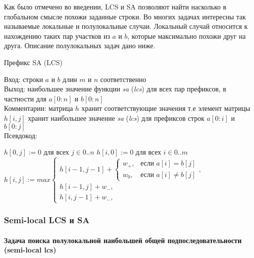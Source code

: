 Как было отмечено во введении, LCS  и SA позволяют найти насколько в глобальном смысле похожи заданные строки.
Во многих задачах интересны так называемые локальные и полулокальные случаи.
Локальный случай относится к нахождению таких пар участков из $a$ и $b$, которые максимально похожи друг на друга.
Описание полулокальных задач дано ниже.
\begin{algorithm}
\caption{Префикс SA (LCS)}\label{alg:lcssa}
Вход: строки $a$ и $b$ длин $m$ и $n$ соответственно\\
Выход: наибольшее значение функции \emph{sa} (\emph{lcs}) для всех пар префиксов, в частности для $a[0:n]$ и $b[0:n]$\\
Комментарии: матрица $h$ хранит соответствующие значения т.е элемент матрицы $h[i,j]$ хранит наибольшее значение \emph{sa} (\emph{lcs}) для префиксов строк $a[0:i]$ и  $b[0:j]$\\
Псевдокод: 
\begin{algorithmic}[1]
\State $h[0, j] := 0$ для всех $j \in 0..n$ 
\State $h[i, 0] := 0$ для всех $i \in 0..m$
\State $h[i,j] := max \begin{cases}
			h[i-1,j-1] +  
			\begin{cases}
			w_{+}, & \text{если $a[i]= b[j]$} \\
			w_{0}, &  \text{если $a[i]\neq b[j]$}
			\end{cases}, & \text{} \\
            h[i-1,j] + w_{-}, & \text{} \\
            h[i,j-1] + w_{-}, & \text{}
		 \end{cases}$
\EndFor
\EndFor
\end{algorithmic}
\end{algorithm}


\subsubsection{Semi-local LCS и SA}

\paragraph*{Задача поиска полулокальной наибольшей общей подпоследовательности (semi-local lcs)}\mbox{}

